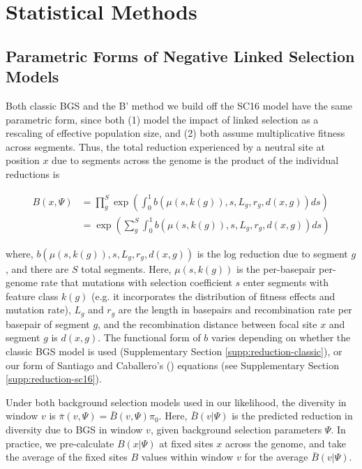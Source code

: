 \documentclass[11pt]{article}
\begin{document}



\section{Statistical Methods}

\subsection{Parametric Forms of Negative Linked Selection Models}

Both classic BGS and the B' method we build off the SC16 model have the same
parametric form, since both (1) model the impact of linked selection as a
rescaling of effective population size, and (2) both assume multiplicative
fitness across segments. Thus, the total reduction experienced by a neutral
site at position $x$ due to segments across the genome is the product of the
individual reductions is

\begin{align}
  \label{supp-eq:b}
  B(x, \Psi) &= \prod_g^S \exp \left( \int_0^1 b(\mu(s, k(g)), s, L_g, r_g, d(x, g)) ds \right) \\
             &= \exp \left( \sum_g^S \int_0^1 b(\mu(s, k(g)), s, L_g, r_g, d(x, g)) ds \right)
\end{align}

where, $b(\mu(s, k(g)), s, L_g, r_g, d(x,g))$ is the log reduction due to
segment $g$, and there are $S$ total segments. Here, $\mu(s, k(g))$ is the
per-basepair per-genome rate that mutations with selection coefficient $s$
enter segments with feature class $k(g)$ (e.g. it incorporates the distribution
of fitness effects and mutation rate), $L_g$ and $r_g$ are the length in
basepairs and recombination rate per basepair of segment $g$, and the
recombination distance between focal site $x$ and segment $g$ is $d(x, g)$. The
functional form of $b$ varies depending on whether the classic BGS model is
used (Supplementary Section \ref{supp:reduction-classic}), or our form of
Santiago and Caballero's (\citeyear{Santiago2016-mu}) equations (see
Supplementary Section \ref{supp:reduction-sc16}).

Under both background selection models used in our likelihood, the diversity in
window $v$ is $\bar{\pi}(v, \Psi) = \bar{B}(v, \Psi) \pi_0$. Here, $\bar{B}(v |
\Psi)$ is the predicted reduction in diversity due to BGS in window $v$, given
background selection parameters $\Psi$. In practice, we pre-calculate $B(x |
\Psi)$ at fixed sites $x$ across the genome, and take the average of the fixed
sites $B$ values within window $v$ for the average $\bar{B}(v | \Psi)$. 
\end{document}
